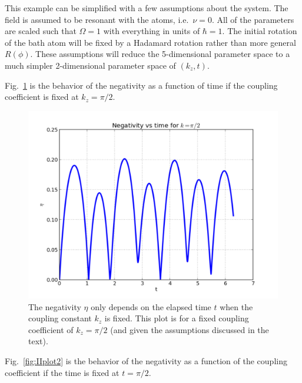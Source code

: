 This example can be simplified with a few assumptions about the system.  The field is assumed to be resonant with the atoms, i.e.\ $\nu=0$. All of the parameters are scaled such that $\Omega=1$ with everything in units of $\hbar=1$.  The initial rotation of the bath atom will be fixed by a Hadamard rotation rather than more general $R(\phi)$.  These assumptions will reduce the 5-dimensional parameter space to a much simpler 2-dimensional parameter space of $(k_z,t)$.
 
Fig.\ \ref{fig:plot1} is the behavior of the negativity as a function of time if the coupling coefficient is fixed at $k_z=\pi/2$.  
\begin{figure}[th]
\includegraphics[scale=0.75]{figure1.pdf}
\caption{The negativity $\eta$ only depends on the elapsed time $t$ when the coupling constant $k_z$ is fixed.  This plot is for a fixed coupling coefficient of $k_z=\pi/2$ (and given the assumptions discussed in the text).}
 \label{fig:plot1}
\end{figure}
Fig.\ \ref{fig:IIplot2} is the behavior of the negativity as a function of the coupling coefficient if the time is fixed at $t=\pi/2$.  
